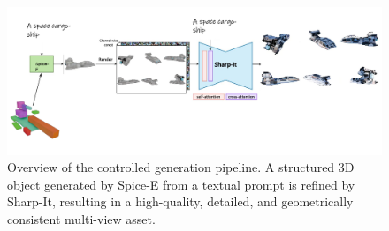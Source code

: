 \begin{figure}[t]
  \centering
  \includegraphics[width=\linewidth]{images/ControlledGen.png} %
  \caption{
    Overview of the controlled generation pipeline. A structured 3D object generated by Spice-E from a textual prompt is refined by Sharp-It, resulting in a high-quality, detailed, and geometrically consistent multi-view asset.
  }
  \label{fig:controlled-generation}
\end{figure}